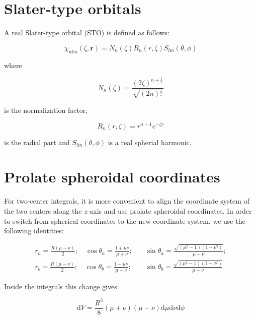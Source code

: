 \documentclass[a4paper]{article}
\newcommand{\bold}[1]{\mathbf{#1}}
\newcommand{\dd}{\mathrm{d}}
\begin{document}
\section{Slater-type orbitals}

A real Slater-type orbital (STO) is defined as follows: 

\begin{equation}
  \chi_{nlm}(\zeta, \bold{r}) = N_n(\zeta) R_n(r, \zeta) S_{lm}(\theta, \phi)
  \label{eq:real_sto}
\end{equation}

where

\begin{equation}
  N_n(\zeta) = \frac{(2\zeta)^{n+\frac{1}{2}}}{\sqrt{(2n)!}} 
  \label{eq:norm_sto}
\end{equation}

is the normalization factor,

\begin{equation}
  R_n(r,\zeta) = r^{n-1} e^{-\zeta r} 
  \label{eq:sto_radial_part}
\end{equation}

is the radial part and $S_{lm}(\theta, \phi)$ is a real spherial harmonic.

\section{Prolate spheroidal coordinates}

For two-center integrals, it is more convenient to align the coordinate
system of the two centers along the $z$-axis and use prolate spheroidal
coordinates. In order to switch from spherical coordinates to the new
coordinate system, we use the following identities:  

\begin{equation}
  \begin{aligned}
    r_a = \frac{R(\mu+\nu)}{2}; \quad 
    \cos\theta_a = \frac{1+\mu\nu}{\mu+\nu}; \quad &
    \sin\theta_a = \frac{\sqrt{(\mu^2-1)(1-\nu^2)}}{\mu+\nu}; \\
    r_b = \frac{R(\mu-\nu)}{2}; \quad 
    \cos\theta_b = \frac{1-\mu\nu}{\mu-\nu}; \quad &
    \sin\theta_b = \frac{\sqrt{(\mu^2-1)(1-\nu^2)}}{\mu-\nu}
  \end{aligned}
  \label{eq:prolate_spheroidal_coordinates}
\end{equation}

Inside the integrals this change gives 

\begin{equation}
  \dd V = \frac{R^3}{8} (\mu+\nu) (\mu-\nu) \dd\mu \dd\nu \dd\phi
\label{eq:prolate_spheroidal_coordinates_integration}
\end{equation}
\end{document}
